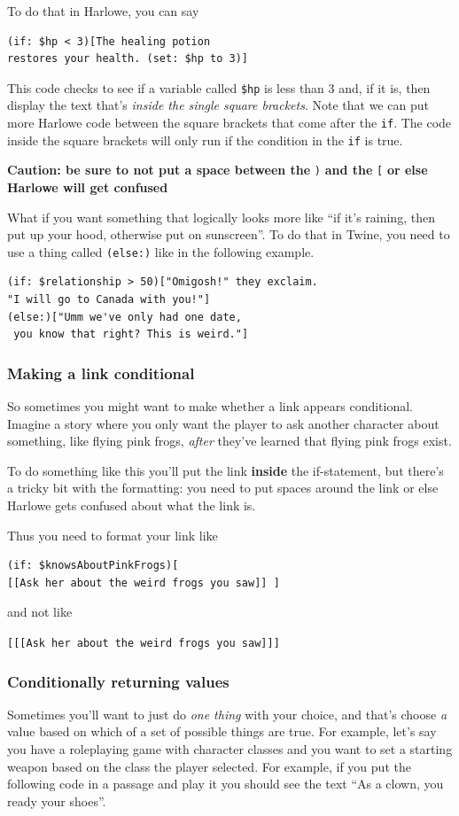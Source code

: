 \documentclass[a5paper,11pt]{article}
\begin{document}
To do that in Harlowe, you can say
\begin{verbatim}
(if: $hp < 3)[The healing potion 
restores your health. (set: $hp to 3)]
\end{verbatim}
This code checks to see if a variable called \verb"$hp" is less than 3 and, if it is, then display the text that's \emph{inside the single square brackets}. Note that we can put more Harlowe code between the square brackets that come after the \verb"if". The code inside the square brackets will only run if the condition in the \verb"if" is true. 

\textbf{Caution: be sure to not put a space between the} \verb")" \textbf{and the} \verb"[" \textbf{or else Harlowe will get confused}

What if you want something that logically looks more like ``if it's raining, then put up your hood, otherwise put on sunscreen''. To do that in Twine, you need to use a thing called \verb"(else:)" like in the following example.

\begin{verbatim}
(if: $relationship > 50)["Omigosh!" they exclaim. 
"I will go to Canada with you!"]
(else:)["Umm we've only had one date, 
 you know that right? This is weird."]
\end{verbatim}

\subsubsection{Making a link conditional}
So sometimes you might want to make whether a link appears conditional. Imagine a story where you only want the player to ask another character about something, like flying pink frogs, \textit{after} they've learned that flying pink frogs exist.

To do something like this you'll put the link \textbf{inside} the if-statement, but there's a tricky bit with the formatting: you need to put spaces around the link or else Harlowe gets confused about what the link is.

Thus you need to format your link like

\begin{verbatim}
(if: $knowsAboutPinkFrogs)[ 
[[Ask her about the weird frogs you saw]] ]
\end{verbatim}
and not like

\verb"[[[Ask her about the weird frogs you saw]]]"

\subsubsection{Conditionally returning values}
Sometimes you'll want to just do \emph{one thing} with your choice, and that's choose \emph{a} value based on which of a set of possible things are true. For example, let's say you have a roleplaying game with character classes and you want to set a starting weapon based on the class the player selected. For example, if you put the following code in a passage and play it you should see the text ``As a clown, you ready your shoes''.
\end{document}
